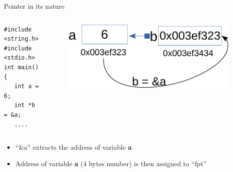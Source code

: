 \begin{frame}[fragile]{Pointer in its nature}
\vspace{-0.15in}
\begin{columns}
\begin{column}{0.45\linewidth}
\begin{lstlisting}
#include <string.h>
#include <stdio.h>
int main()
{
   int a = 6;
   int *b = &a;
   ....
\end{lstlisting}
\end{column}
\begin{column}{0.5\linewidth}
\begin{figure}
\begin{center}
	\includegraphics[width=0.8\linewidth]{figs/pointer.pdf}
\end{center}
\end{figure}
\end{column}
\end{columns}
\vspace{-0.15in}
\begin{itemize}
	\item {``\&a'' extracts the address of variable \textbf{a}}
	\item {Address of variable \textbf{a} (4 bytes number) is then assigned to ``fpt''}
\end{itemize}
\end{frame}

